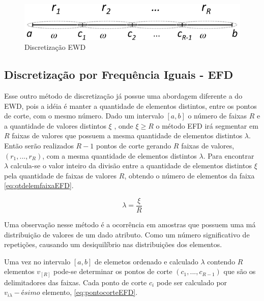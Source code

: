 \begin{figure}[h] 
        \centering
        \includegraphics[scale=0.6]{figs/discretizacaoEWD.png}
        \caption[Discretização EWD]{Discretização EWD \footnotemark } 
        \label{fig:faixasEWD}
\end{figure}



\subsection{Discretização por Frequência Iguais - EFD}\label{cap:refTeor:subsec:efd}

Esse outro método de discretização já possue uma abordagem diferente a do EWD, pois a idéia é manter a quantidade de elementos distintos, entre os pontos de corte, com o mesmo número. Dado um intervalo ${[a,b]}$ o número de faixas ${R}$ e a quantidade de valores distintos ${\xi}$ , onde ${\xi \geqslant R}$ o método EFD irá segmentar em  ${R}$ faixas de valores que possuem a mesma quantidade de elementos distintos ${\lambda}$. Então serão realizados ${R-1}$ pontos de corte gerando ${R}$ faixas de valores, ${(r_1,...,r_R)}$, com a mesma quantidade de elementos distintos ${\lambda}$. Para encontrar ${\lambda}$ calcula-se o valor inteiro da divisão entre a quantidade de elementos distintos ${\xi}$ pela quantidade de faixas de valores ${R}$, obtendo o número de elementos da faixa \ref{eq:qtdelemfaixaEFD}.

\begin{equation}
\lambda = \frac{\xi}{R}
 \label{eq:qtdelemfaixaEFD}
\end{equation}

Uma observação nesse método é a ocorrência em amostras que possuem uma má distribuição de valores de um dado atributo. Como um número significativo de repetições, causando um desiquilíbrio nas distribuições dos elementos.

Uma vez no intervalo ${[a,b]}$ de elemetos ordenado e calculado ${\lambda}$ contendo ${R}$ elementos ${v_{[R]}}$  pode-se determinar os pontos de corte ${(c_1,...,c_{R-1})}$ que são os delimitadores das faixas. Cada ponto de corte ${c_i}$ pode ser calculado por ${v_{i\lambda}-ésimo}$ elemento, \ref{eq:pontocorteEFD}.

